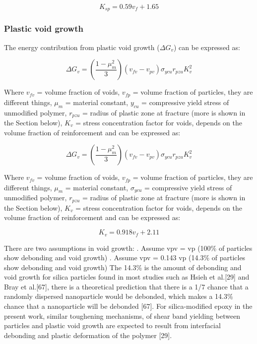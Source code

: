 \documentclass[numbers=noendperiod,chapterprefix=on]{icldt} %
\begin{document}
\begin{equation} 
K_{sp}=0.59v_f+1.65
\end{equation}

\subsubsection{Plastic void growth}
The energy contribution from plastic void growth ($\Delta G_v$) can be expressed as:

\begin{equation} 
\Delta G_v=\left( \frac{1-\mu_m^2}{3}\right) 
\left( v_{fv}-v_{pv}\right) 
\sigma_{ycu} r_{pzu} K_v^2
\end{equation}

Where $v_{fv}$ = volume fraction of voids, $v_{fp}$ = volume fraction of particles, they are different things, $\mu_m$ = material constant, $y_{cu}$ = compressive yield stress of unmodified polymer, $r_{pzu}$ = radius of plastic zone at fracture (more is shown in the Section below), $K_v$ = stress concentration factor for voids, depends on the volume fraction of reinforcement and can be expressed as:

\begin{equation} 
\Delta G_v=\left( \frac{1-\mu_m^2}{3}\right) 
(v_{fv}-v_{pv}
)\sigma_{ycu} r_{pzu} K_v^2
\end{equation}

Where $v_{fv}$ = volume fraction of voids, $v_{fp}$ = volume fraction of particles, they are different things, $\mu _m$ = material constant, $\sigma_{ycu}$ = compressive yield stress of unmodified polymer, $r_{pzu}$ = radius of plastic zone at fracture (more is shown in the Section below), $K_v$ = stress concentration factor for voids, depends on the volume fraction of reinforcement and can be expressed as:

\begin{equation} 
K_v=0.918v_f+2.11
\end{equation}

There are two assumptions in void growth:
.	Assume vpv = vp (100\% of particles show debonding and void growth) 
.	Assume vpv = 0.143 vp (14.3\% of particles show debonding and void growth)
\newline
The 14.3\% is the amount of debonding and void growth for silica particles found in most studies such as Hsieh et al.[29] and Bray et al.[67], there is a theoretical prediction that there is a 1/7 chance that a randomly dispersed nanoparticle would be debonded, which makes a 14.3\% chance that a nanoparticle will be debonded [67].
For silica-modified epoxy in the present work, similar toughening mechanisms, of shear band yielding between particles and plastic void growth are expected to result from interfacial debonding and plastic deformation of the polymer [29]. 
\end{document}
